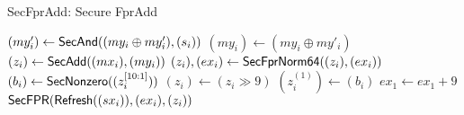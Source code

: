 \begin{frame}{SecFprAdd: Secure FprAdd}
{\begin{algorithm}[H]
\begin{multicols}{2}
\begin{algorithmic}[1]
    \STATE $(my'_i) \gets {\sf SecAnd}(  (my_i \oplus my'_i), (s_i) )$
    \STATE $(my_i) \gets (my_i \oplus my'_i)$ 
    \STATE $(z_i) \gets {\sf SecAdd}( (mx_i),  (my_i) )$  \label{alg:SecFprAdd:SecAdd_3}
    \STATE $(z_i), (ex_i) \gets {\sf SecFprNorm64}( (z_i), (ex_i) )$
    \STATE $(b_i) \gets {\sf SecNonzero} ( (z_i^{[10:1]}) )$
    \STATE $(z_i) \gets (z_i \gg 9)$ \label{alg:SecFprAdd:shift_9}
    \STATE $(z_i^{(1)}) \gets (b_i) $ 
    \STATE $ex_1 \gets ex_1 + 9$
    \STATE \Return ${\sf SecFPR} ( {\sf Refresh}((sx_i)), (ex_i), (z_i) )$

  \end{algorithmic}
  \end{multicols}
\vspace{-10pt}
\end{algorithm}

\blockalgend
}
\medskip



\end{frame}